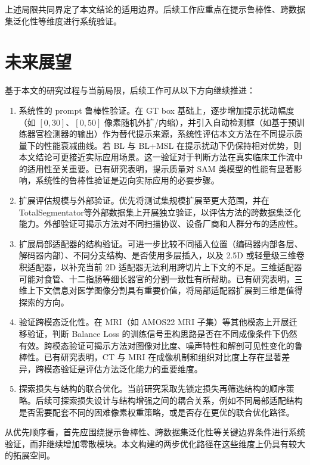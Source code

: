 上述局限共同界定了本文结论的适用边界。后续工作应重点在提示鲁棒性、跨数据集泛化性等维度进行系统验证。

\section{未来展望}

基于本文的研究过程与当前局限，后续工作可从以下方向继续推进：

\begin{enumerate}
  \item 系统性的 prompt 鲁棒性验证。在 GT box 基础上，逐步增加提示扰动幅度（如 $[0, 30]$、$[0, 50]$ 像素随机外扩/内缩），并引入自动检测框（如基于预训练器官检测器的输出）作为替代提示来源，系统性评估本文方法在不同提示质量下的性能衰减曲线。若 BL 与 BL+MSL 在提示扰动下仍保持相对优势，则本文结论可更接近实际应用场景。这一验证对于判断方法在真实临床工作流中的适用性至关重要。已有研究表明，提示质量对 SAM 类模型的性能有显著影响\cite{shaharabany2023autosam,wong2024scribbleprompt}，系统性的鲁棒性验证是迈向实际应用的必要步骤。

  \item 扩展评估规模与外部验证。优先将测试集规模扩展至更大范围，并在 TotalSegmentator\cite{wasserthal2023totalsegmentator}等外部数据集上开展独立验证，以评估方法的跨数据集泛化能力。外部验证可揭示方法对不同扫描协议、设备厂商和人群分布的适应性。

  \item 扩展局部适配器的结构验证。可进一步比较不同插入位置（编码器内部各层、解码器内部）、不同分支结构、是否使用多层插入，以及 2.5D 或轻量级三维卷积适配器，以补充当前 2D 适配器无法利用跨切片上下文的不足。三维适配器可能对食管、十二指肠等细长器官的分割一致性有所帮助。已有研究表明，三维上下文信息对医学图像分割具有重要价值\cite{cicek20163dunet}，将局部适配器扩展到三维是值得探索的方向。

  \item 验证跨模态泛化性。在 MRI（如 AMOS22 MRI 子集）等其他模态上开展迁移验证，判断 Balance Loss 的训练信号重构思路是否在不同成像条件下仍然有效。跨模态验证可揭示方法对图像对比度、噪声特性和解剖可见性变化的鲁棒性。已有研究表明，CT 与 MRI 在成像机制和组织对比度上存在显著差异\cite{litjens2017survey}，跨模态验证是评估方法泛化能力的重要维度。

  \item 探索损失与结构的联合优化。当前研究采取先锁定损失再筛选结构的顺序策略。后续可探索损失设计与结构增强之间的耦合关系，例如不同局部适配结构是否需要配套不同的困难像素权重策略，或是否存在更优的联合优化路径。
\end{enumerate}

从优先顺序看，首先应围绕提示鲁棒性、跨数据集泛化性等关键边界条件进行系统验证，而非继续增加零散模块。本文构建的两步优化路径在这些维度上仍具有较大的拓展空间。
